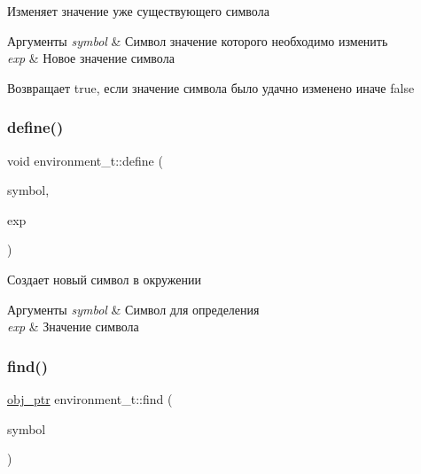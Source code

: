 Изменяет значение уже существующего символа 


\begin{DoxyParams}{Аргументы}
{\em symbol} & Символ значение которого необходимо изменить \\
\hline
{\em exp} & Новое значение символа \\
\hline
\end{DoxyParams}
\begin{DoxyReturn}{Возвращает}
true, если значение символа было удачно изменено иначе false 
\end{DoxyReturn}
\mbox{\label{classenvironment__t_a5186921234c3252294cbd37e6616dc26}} 
\subsubsection{\texorpdfstring{define()}{define()}}
{\footnotesize\ttfamily void environment\+\_\+t\+::define (\begin{DoxyParamCaption}\item[{\mbox{\hyperlink{lisp__types_8hpp_a543c62d3ca4ba3750602b9c6b11af1de}{symbol\+\_\+t}} \&}]{symbol,  }\item[{\mbox{\hyperlink{classmm__ptr}{obj\+\_\+ptr}}}]{exp }\end{DoxyParamCaption})}



Создает новый символ в окружении 


\begin{DoxyParams}{Аргументы}
{\em symbol} & Символ для определения \\
\hline
{\em exp} & Значение символа \\
\hline
\end{DoxyParams}
\mbox{\label{classenvironment__t_a29d163ecd74f5fae6a0ac5614d580387}} 
\subsubsection{\texorpdfstring{find()}{find()}}
{\footnotesize\ttfamily \mbox{\hyperlink{classmm__ptr}{obj\+\_\+ptr}} environment\+\_\+t\+::find (\begin{DoxyParamCaption}\item[{\mbox{\hyperlink{lisp__types_8hpp_a543c62d3ca4ba3750602b9c6b11af1de}{symbol\+\_\+t}} \&}]{symbol }\end{DoxyParamCaption})}



